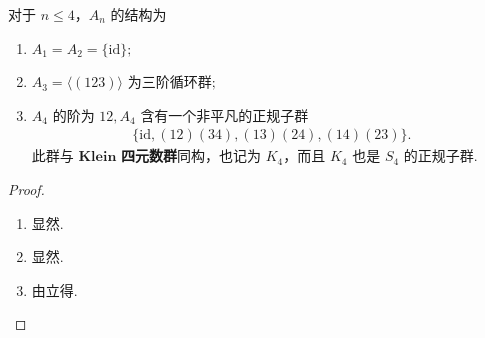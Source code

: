 \documentclass[../../main.tex]{subfiles}%
\begin{document}
\begin{proposition}
对于 \( n \leqslant 4 \)，\( A_n \) 的结构为
\begin{enumerate}[(1)]
\item $A_1 = A_2 = \{\mathrm{id}\};$

\item $A_3 = \langle (123) \rangle \text{ 为三阶循环群}; $

\item $A_4 \text{ 的阶为 12}, A_4 \text{ 含有一个非平凡的正规子群}$
\begin{align*}
\{\mathrm{id}, (12)(34), (13)(24), (14)(23)\}.
\end{align*}
此群与 $\mathbf{Klein}$ \textbf{四元数群}同构，也记为 \( K_4 \)，而且 \( K_4 \) 也是 \( S_4 \) 的正规子群.
\end{enumerate}
\end{proposition}
\begin{proof}
\begin{enumerate}[(1)]
\item 显然.

\item 显然.

\item 由立得.
\end{enumerate}
\end{proof}
\end{document}
